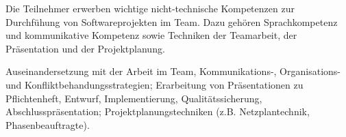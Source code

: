 \begin{course}
\begin{learningoutcomes}
Die Teilnehmer erwerben wichtige nicht-technische Kompetenzen zur Durchfühung von Softwareprojekten im Team. Dazu gehören Sprachkompetenz und kommunikative Kompetenz sowie Techniken der Teamarbeit, der Präsentation und der Projektplanung.


\end{learningoutcomes}

\begin{content}
Auseinandersetzung mit der Arbeit im Team, Kommunikations-, Organisations- und Konfliktbehandungsstrategien; Erarbeitung von Präsentationen zu Pflichtenheft, Entwurf, Implementierung, Qualitätssicherung, Abschlusspräsentation; Projektplanungstechniken (z.B. Netzplantechnik, Phasenbeauftragte).


\end{content}







\end{course}